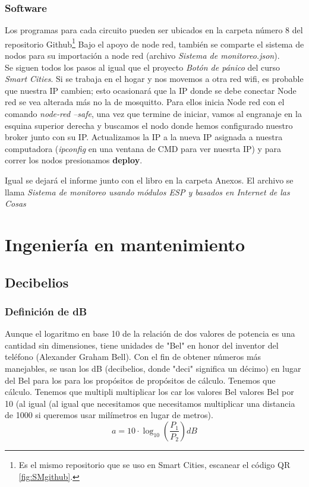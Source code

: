 \documentclass[
	12pt, %
	fleqn, %
	a4paper, %
	oneside, %
]{LegrandOrangeBook}
\begin{document}
\section{Software}
Los programas para cada circuito pueden ser ubicados en la carpeta número 8 del repositorio Github\footnote{Es el mismo repositorio que se uso en Smart Cities, escanear el código QR \ref{fig:SMgithub}.} Bajo el apoyo de node red, también se comparte el sistema de nodos para su importación a node red (archivo \textit{Sistema de monitoreo.json}).\\
Se siguen todos los pasos al igual que el proyecto \textit{Botón de pánico} del curso \textit{Smart Cities}. Si se trabaja en el hogar y nos movemos a otra red wifi, es probable que nuestra IP cambien; esto ocasionará que la IP donde se debe conectar Node red se vea alterada más no la de mosquitto. Para ellos inicia Node red con el comando \textit{node-red --safe}, una vez que termine de iniciar, vamos al engranaje en la esquina superior derecha y buscamos el nodo donde hemos configurado nuestro broker junto con su IP. Actualizamos la IP a la nueva IP asignada a nuestra computadora (\textit{ipconfig} en una ventana de CMD para ver nuesrta IP) y para correr los nodos presionamos \textbf{deploy}.
\begin{notation}
Igual se dejará el informe junto con el libro en la carpeta Anexos. El archivo se llama \textit{Sistema de monitoreo usando módulos ESP y basados en Internet de las Cosas}
\end{notation}
\part{Ingeniería en mantenimiento}
\chapter{Decibelios}\label{chap:decibelios}
\section{Definición de dB}
Aunque el logaritmo en base 10 de la relación de dos valores de potencia es una cantidad sin dimensiones, tiene unidades de "Bel" en honor del inventor del teléfono (Alexander Graham Bell). Con el fin de obtener números más manejables, se usan los dB (decibelios, donde "deci" significa un décimo) en lugar del Bel  para los  para los propósitos de propósitos de cálculo. Tenemos que cálculo. Tenemos que multipli multiplicar los car los valores Bel valores Bel por 10 (al igual (al igual que necesitamos que necesitamos multiplicar una distancia de 1000 si queremos usar milímetros en lugar de metros).
\begin{equation}
\label{art:decibel}
a=10\cdot \log_{10}\left(\frac{P_1}{P_2}\right)dB
\end{equation}
\end{document}
